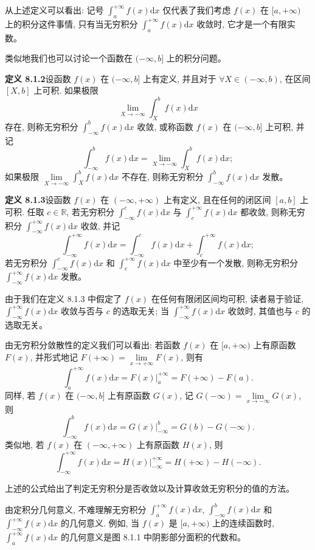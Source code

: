 \documentclass[UTF8, 12pt, fontset=fandol, oneside]{ctexart}
\begin{document}
从上述定义可以看出: 记号 $\int_a^{+\infty}f(x)\mathrm dx$ 仅代表了我们考虑 $f(x)$ 在 $[a,+\infty)$ 上的积分这件事情, 只有当无穷积分 $\int_a^{+\infty}f(x)\mathrm dx$ 收敛时, 它才是一个有限实数。

类似地我们也可以讨论一个函数在 $(-\infty,b]$ 上的积分问题。

\noindent\textbf{定义 8.1.2}\quad 设函数 $f(x)$ 在 $(-\infty,b]$ 上有定义, 并且对于 $\forall X\in(-\infty,b)$, 在区间 $[X,b]$ 上可积. 如果极限
\[
  \lim_{X\to-\infty}\int_X^b f(x)\mathrm dx
\]
存在, 则称无穷积分 $\int_{-\infty}^b f(x)\mathrm dx$ 收敛, 或称函数 $f(x)$ 在 $(-\infty,b]$ 上可积, 并记
\[
  \int_{-\infty}^b f(x)\mathrm dx=\lim_{X\to-\infty}\int_X^b f(x)\mathrm dx;
\]
如果极限 $\lim\limits_{X\to-\infty}\int_X^b f(x)\mathrm dx$ 不存在, 则称无穷积分 $\int_{-\infty}^b f(x)\mathrm dx$ 发散。

\noindent\textbf{定义 8.1.3}\quad 设函数 $f(x)$ 在 $(-\infty,+\infty)$ 上有定义, 且在任何的闭区间 $[a,b]$ 上可积. 任取 $c\in\mathbb R$, 若无穷积分 $\int_{-\infty}^c f(x)\mathrm dx$ 与 $\int_c^{+\infty}f(x)\mathrm dx$ 都收敛, 则称无穷积分 $\int_{-\infty}^{+\infty}f(x)\mathrm dx$ 收敛, 并记
\[
  \int_{-\infty}^{+\infty}f(x)\mathrm dx
  =
  \int_{-\infty}^c f(x)\mathrm dx
  +
  \int_c^{+\infty}f(x)\mathrm dx;
\]
若无穷积分 $\int_{-\infty}^c f(x)\mathrm dx$ 和 $\int_c^{+\infty}f(x)\mathrm dx$ 中至少有一个发散, 则称无穷积分 $\int_{-\infty}^{+\infty}f(x)\mathrm dx$ 发散。

由于我们在定义 8.1.3 中假定了 $f(x)$ 在任何有限闭区间均可积, 读者易于验证, $\int_{-\infty}^{+\infty}f(x)\mathrm dx$ 收敛与否与 $c$ 的选取无关; 当 $\int_{-\infty}^{+\infty}f(x)\mathrm dx$ 收敛时, 其值也与 $c$ 的选取无关。

由无穷积分敛散性的定义我们可以看出: 若函数 $f(x)$ 在 $[a,+\infty)$ 上有原函数 $F(x)$, 并形式地记 $F(+\infty)=\lim\limits_{x\to+\infty}F(x)$, 则有
\[
  \int_a^{+\infty}f(x)\mathrm dx=F(x)\big|_a^{+\infty}=F(+\infty)-F(a).
\]
同样, 若 $f(x)$ 在 $(-\infty,b]$ 上有原函数 $G(x)$, 记 $G(-\infty)=\lim\limits_{x\to-\infty}G(x)$, 则
\[
  \int_{-\infty}^b f(x)\mathrm dx=G(x)\big|_{-\infty}^b=G(b)-G(-\infty).
\]
类似地, 若 $f(x)$ 在 $(-\infty,+\infty)$ 上有原函数 $H(x)$, 则
\[
  \int_{-\infty}^{+\infty}f(x)\mathrm dx=H(x)\big|_{-\infty}^{+\infty}=H(+\infty)-H(-\infty).
\]

上述的公式给出了判定无穷积分是否收敛以及计算收敛无穷积分的值的方法。

由定积分几何意义, 不难理解无穷积分 $\int_a^{+\infty}f(x)\mathrm dx$, $\int_{-\infty}^b f(x)\mathrm dx$ 和 $\int_{-\infty}^{+\infty}f(x)\mathrm dx$ 的几何意义. 例如, 当 $f(x)$ 是 $[a,+\infty)$ 上的连续函数时, $\int_a^{+\infty}f(x)\mathrm dx$ 的几何意义是图 8.1.1 中阴影部分面积的代数和。
\end{document}
